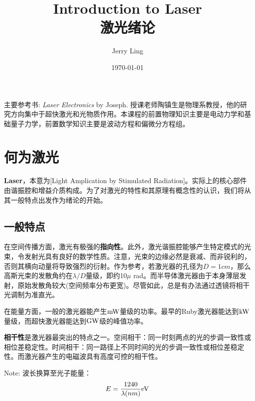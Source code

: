 \documentclass[12pt]{ctexart}%
\title{Introduction to Laser\\激光绪论}
\author{Jerry Ling}
\date{\today}
\begin{document}
\maketitle
主要参考书: \textit{Laser Electronics} by Joseph. 授课老师陶镇生是物理系教授，他的研究方向集中于超快激光和光物质作用。本课程的前置物理知识主要是电动力学和基础量子力学，前置数学知识主要是波动方程和偏微分方程组。
\section*{何为激光}
\textbf{Laser}，本意为[Light Amplication by Stimulated Radiation]。实际上的核心部件由谐振腔和增益介质构成。为了对激光的特性和其原理有概念性的认识，我们将从其一般特点出发作为绪论的开始。
\subsection*{一般特点}
\par 在空间传播方面，激光有极强的\textbf{指向性}。此外，激光谐振腔能够产生特定模式的光束，令发射光具有良好的数学性质。注意，光束的边缘必然是衰减、而非锐利的，否则其横向动量将导致强烈的衍射。作为参考，若激光器的孔径为$D=1cm$，那么高斯光束的发散角约在$\lambda/D$量级，即约10$\mu$ rad。而半导体激光器由于本身薄层发射，原始发散角较大(空间频率分布更宽)。尽管如此，总是有办法通过透镜将相干光调制为准直光。
\par 在能量方面，一般的激光器能产生$\textup{mW}$量级的功率。最早的Ruby激光器能达到$\textup{kW}$量级，而超快激光器能达到$\textup{GW}$级的峰值功率。
\par \textbf{相干性}是激光器最突出的特点之一。空间相干：同一时刻两点的光的步调一致性或相位差稳定性。时间相干：同一路径上不同时间的光的步调一致性或相位差稳定性。而激光器产生的电磁波具有高度可控的相干性。
\par Note: 波长换算至光子能量：
\begin{equation}
    E = \frac{1240}{\lambda (nm)}\textup{eV}
\end{equation}
\end{document}
